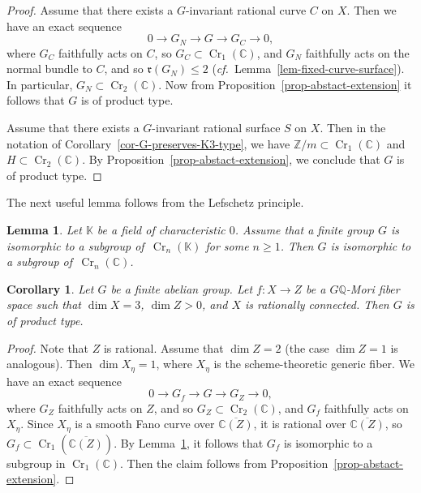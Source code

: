 \documentclass[11pt]{amsart}
\numberwithin{equation}{section}
\newtheorem{corollary}[thm]{Corollary}
\newtheorem{lem}[thm]{Lemma}
\theoremstyle{definition}
\theoremstyle{remark}
\newcommand{\lra}{\longrightarrow}
\DeclareMathOperator{\Cr}{Cr}
\begin{document}
\begin{proof}
Assume that there exists a $G$-invariant rational curve $C$ on $X$. Then we have an exact sequence
\begin{equation}
0\lra G_N \lra G \lra G_C \lra 0, 
\end{equation}
where $G_C$ faithfully acts on $C$, so $G_C\subset \Cr_1(\mathbb{C})$, and $G_N$ faithfully acts on the normal bundle to $C$, and so $\mathfrak{r}(G_N)\leq 2$ (\textit{cf.}~Lemma~\ref{lem-fixed-curve-surface}). In particular, $G_N\subset \Cr_2(\mathbb{C})$. Now from Proposition~\ref{prop-abstact-extension} it follows that $G$ is of product type. 

Assume that there exists a $G$-invariant rational surface $S$ on $X$. Then in the notation of Corollary~\ref{cor-G-preserves-K3-type}, we have $\mathbb{Z}/m\subset \Cr_1(\mathbb{C})$ and $H\subset \Cr_2(\mathbb{C})$. By Proposition~\ref{prop-abstact-extension}, we conclude that $G$ is of product type. 
\end{proof}

The next useful lemma follows from the Lefschetz principle. 

\begin{lem}
\label{lem-lefschetz}
Let $\mathbb{K}$ be a field of characteristic $0$. Assume that a finite group $G$ is isomorphic to a subgroup of\, $\Cr_n(\mathbb{K})$ for some $n\geq 1$. Then $G$ is isomorphic to a subgroup of\, $\Cr_n(\mathbb{C})$. 
\end{lem}

\begin{corollary}
\label{cor-exclude-positive-dim-base}
Let $G$ be a finite abelian group. 
Let $f\colon X\to Z$ be a $G\mathbb{Q}$-Mori fiber space such that $\dim X=3$, $\dim Z>0$, and $X$ is rationally connected. Then $G$ is of product type. 
\end{corollary}

\begin{proof}
Note that $Z$ is rational. Assume that $\dim Z=2$ (the case $\dim Z=1$ is analogous). Then $\dim X_\eta=1$, where $X_\eta$ is the scheme-theoretic generic fiber. We have an exact sequence
\begin{equation}
\label{eq-mfs-exact-sequence}
0\lra G_f \lra G \lra G_Z \lra 0, 
\end{equation}
where $G_Z$ faithfully acts on $Z$, and so $G_Z\subset \Cr_2(\mathbb{C})$, and $G_f$ faithfully acts on $X_\eta$. Since $X_\eta$ is a smooth Fano curve over $\overline{\mathbb{C}(Z)}$, it is rational over $\overline{\mathbb{C}(Z)}$, so $G_f\subset \Cr_1(\overline{\mathbb{C}(Z)})$. By Lemma~\ref{lem-lefschetz}, it follows that $G_f$ is isomorphic to a subgroup in $\Cr_1({\mathbb{C}})$. 
Then the claim follows from Proposition~\ref{prop-abstact-extension}.
\end{proof}
\end{document}
